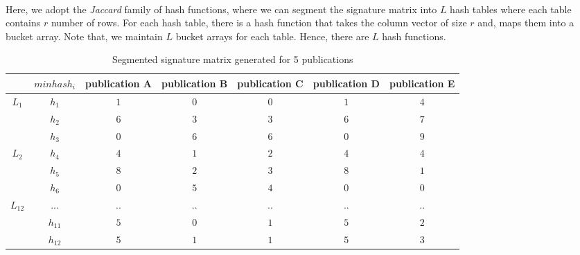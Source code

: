 \documentclass[a4paper,12pt,oneside]{book}
\theoremstyle{definition}
\theoremstyle{remark}
\begin{document}
\paragraph*{}
Here, we adopt the \emph{Jaccard} family of hash functions, where we can segment the signature matrix into $L$ hash tables where each table contains $r$ number of rows. For each hash table, there is a hash function that takes the column vector of size  $r$ and, maps them into a bucket array. Note that, we maintain $L$ bucket arrays for each table. Hence, there are $L$ hash functions.

\begin{table}[h!]
\centering
\begin{tabular}{|c|c|c|c|c|c|c|}
\hline & $minhash_i$ & publication A & publication B & publication C & publication D & publication E \\
\hline \multirow{3}{*}{\cellcolor{lightgray}$L_1$}
& $h_1$ & \cellcolor{blue!25}$1$ & \cellcolor{red!25}$0$ & \cellcolor{red!25}$0$ & \cellcolor{blue!25}$1$ & $4$ \\
\hhline{~-----}
& $h_2$ & \cellcolor{blue!25}$6$ & \cellcolor{red!25}$3$ & \cellcolor{red!25}$3$ & \cellcolor{blue!25}$6$ & $7$ \\
\hhline{~-----}
& $h_3$ & \cellcolor{blue!25}$0$ & \cellcolor{red!25}$6$ & \cellcolor{red!25}$6$ & \cellcolor{blue!25}$0$ & $9$ \\


\hline \multirow{3}{*}{\cellcolor{lightgray}$L_2$}
& $h_4$ & \cellcolor{blue!25}$4$ & $1$ & $2$ & \cellcolor{blue!25}$4$ & $4$ \\
\hhline{~-----}
& $h_5$ & \cellcolor{blue!25}$8$ & $2$ & $3$ & \cellcolor{blue!25}$8$ & $1$ \\
\hhline{~-----}
& $h_6$ & \cellcolor{blue!25}$0$ & $5$ & $4$ & \cellcolor{blue!25}$0$ & $0$ \\


\hline \multirow{3}{*}{\cellcolor{lightgray}$L_{12}$} 
& ... & .. & .. & .. & .. & .. \\
\hhline{~-----}
& $h_{11}$ & $5$ & $0$ & $1$ & $5$ & $2$ \\
\hhline{~-----}
& $h_{12}$ & $5$ & $1$ & $1$ & $5$ & $3$ \\
\hline
\end{tabular}
\caption{Segmented signature matrix generated for 5 publications}
\label{table:sigmatrix3}
\end{table}
\end{document}
